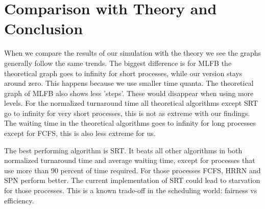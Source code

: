 \documentclass[a4paper,11pt]{article}
\begin{document}
\section{Comparison with Theory and Conclusion}

When we compare the results of our simulation with the theory we see the graphs generally follow the same trends. 
The biggest difference is for MLFB the theoretical graph goes to infinity for short processes, while our version stays around zero.
This happens because we use smaller time quanta.
The theoretical graph of MLFB also shows less 'steps'.
These would disappear when using more levels.
For the normalized turnaround time all theoretical algorithms except SRT go to infinity for very short processes, this is not as extreme with our findings.
The waiting time in the theoretical algorithms goes to infinity for long processes except for FCFS, this is also less extreme for us.

The best performing algorithm is SRT. It beats all other algorithms in both normalized turnaround time and average waiting time,
except for processes that use more than 90 percent of time required.
For those processes FCFS, HRRN and SPN perform better.
The current implementation of SRT could lead to starvation for those processes. 
This is a known trade-off in the scheduling world: fairness vs efficiency.  
\end{document}
